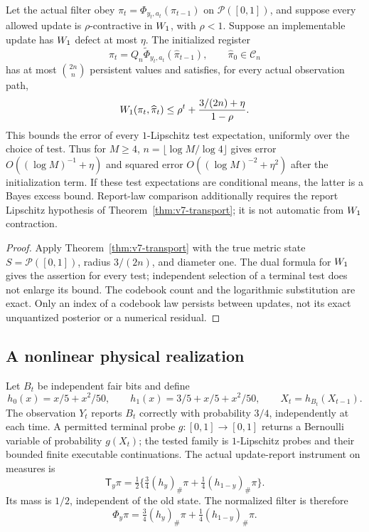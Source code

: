 \begin{theorem}
\label{thm:v7-filter}
Let the actual filter obey $\pi_t=\Phi_{y_t,a_t}(\pi_{t-1})$ on
$\mathcal P([0,1])$, and suppose every allowed update is
$\rho$-contractive in $W_1$, with $\rho<1$. Suppose an implementable
update has $W_1$ defect at most $\eta$. The initialized register
\[
 \widehat\pi_t=Q_n\widetilde\Phi_{y_t,a_t}(\widehat\pi_{t-1}),
              \qquad\widehat\pi_0\in\mathcal C_n
\]
has at most $\binom{2n}{n}$ persistent values and satisfies, for every
actual observation path,
\begin{equation}
 W_1(\pi_t,\widehat\pi_t)
 \le\rho^t+\frac{3/(2n)+\eta}{1-\rho}.                \label{eq:v7-measure-filter}
\end{equation}
This bounds the error of every $1$-Lipschitz test expectation, uniformly
over the choice of test. Thus for $M\ge4$, $n=\lfloor\log M/\log4\rfloor$
gives error $O((\log M)^{-1}+\eta)$ and squared error
$O((\log M)^{-2}+\eta^2)$ after the initialization term. If these test
expectations are conditional means, the latter is a Bayes excess bound.
Report-law comparison additionally requires the report Lipschitz
hypothesis of Theorem~\ref{thm:v7-transport}; it is not automatic from
$W_1$ contraction.
\end{theorem}
\begin{proof}
Apply Theorem~\ref{thm:v7-transport} with the true metric state
$S=\mathcal P([0,1])$, radius $3/(2n)$, and diameter one. The dual
formula for $W_1$ gives the assertion for every test; independent
selection of a terminal test does not enlarge its bound. The codebook
count and the logarithmic substitution are exact. Only an index of a
codebook law persists between updates, not its exact unquantized
posterior or a numerical residual.
\end{proof}

\subsection{A nonlinear physical realization}
Let $B_t$ be independent fair bits and define
\begin{equation}
 h_0(x)=x/5+x^2/50,\qquad
 h_1(x)=3/5+x/5+x^2/50,\qquad X_t=h_{B_t}(X_{t-1}).      \label{eq:v7-nonlinear-ifs}
\end{equation}
The observation $Y_t$ reports $B_t$ correctly with probability $3/4$,
independently at each time. A permitted terminal probe $g:[0,1]\to[0,1]$
returns a Bernoulli variable of probability $g(X_t)$; the tested family
is $1$-Lipschitz probes and their bounded finite executable continuations.
The actual update-report instrument on measures is
\[
 \mathsf T_y\pi=\tfrac12\{\tfrac34(h_y)_\#\pi+
                         \tfrac14(h_{1-y})_\#\pi\}.
\]
Its mass is $1/2$, independent of the old state. The normalized filter is
therefore
\begin{equation}
 \Phi_y\pi=\tfrac34(h_y)_\#\pi+\tfrac14(h_{1-y})_\#\pi. 
                                                               \label{eq:v7-nonlinear-filter}
\end{equation}

